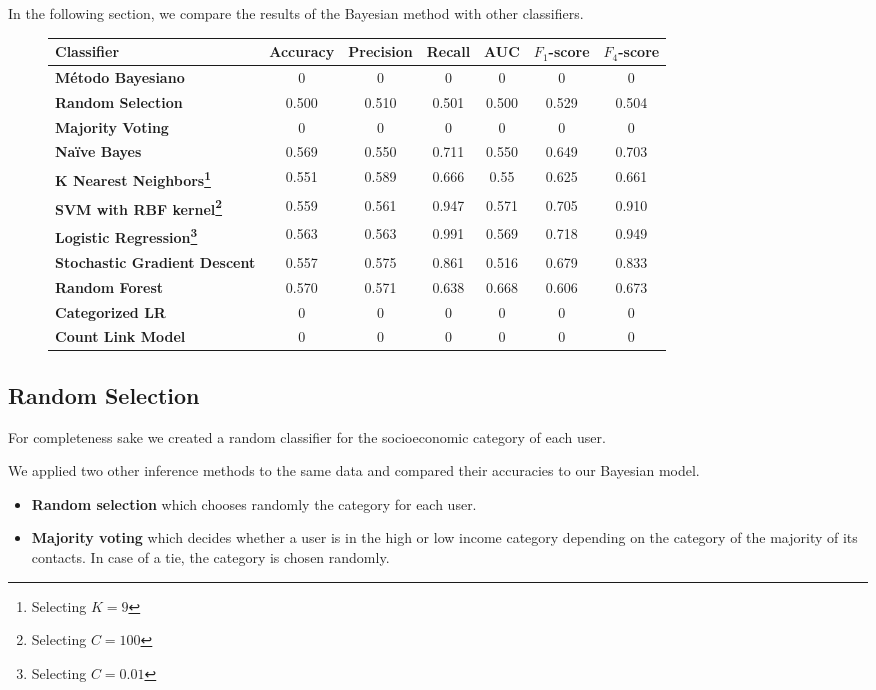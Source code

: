 In the following section, we compare the results of the Bayesian method with other classifiers.

\begin{figure}
	\begin{tabularx}{\textwidth}{>{\bfseries}X c c c c c c}
		\toprule
		\textbf{Classifier} & \textbf{Accuracy} & \textbf{Precision} & \textbf{Recall} & \textbf{AUC} & \textbf{$F_1$}-\textbf{score} & \textbf{$F_4$}-\textbf{score} \\
		\midrule
		Método Bayesiano & 0 & 0 & 0 & 0 & 0 & 0 \\
		\midrule
		Random Selection & 0.500 & 0.510 & 0.501 & 0.500 & 0.529 & 0.504 \\
		Majority Voting & 0 & 0 & 0 & 0 & 0 & 0 \\
		\midrule
		Naïve Bayes & 0.569 & 0.550 & 0.711 & 0.550 & 0.649 & 0.703 \\
		K Nearest Neighbors\footnote{Selecting $K = 9$} & 0.551 & 0.589 & 0.666 & 0.55 & 0.625 & 0.661 \\
		SVM with RBF kernel\footnote{Selecting $C = 100$} & 0.559 & 0.561 & 0.947 & 0.571 & 0.705 & 0.910 \\
		Logistic Regression\footnote{Selecting $C = 0.01$} & 0.563 & 0.563 & 0.991 & 0.569 & 0.718 & 0.949 \\
		Stochastic Gradient Descent & 0.557 & 0.575 & 0.861 & 0.516 & 0.679 & 0.833 \\
		Random Forest & 0.570 & 0.571 & 0.638 & 0.668 & 0.606 & 0.673 \\
		\midrule
		Categorized LR & 0 & 0 & 0 & 0 & 0 & 0 \\
		Count Link Model & 0 & 0 & 0 & 0 & 0 & 0 \\
		\bottomrule
	\end{tabularx}
\end{figure}

\subsection{Random Selection}

For completeness sake we created a random classifier for the socioeconomic category of each user.

We applied two other inference methods to the same data and compared their accuracies to our Bayesian model.

\begin{itemize}
	\item \textbf{Random selection} which chooses randomly the category for each user.
	\item \textbf{Majority voting} which decides whether a user is in the high or low income category depending on the category of the majority of its contacts. In case of a tie, the category is chosen randomly.
\end{itemize}


